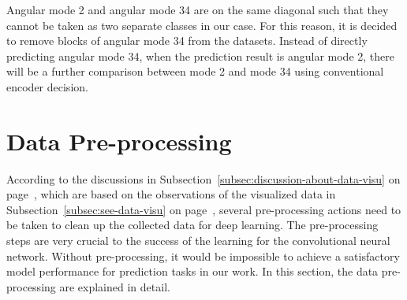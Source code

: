 Angular mode 2 and angular mode 34 are
on the same diagonal such that they cannot 
be taken as two separate classes in our case.
For this reason, it is decided to remove
blocks of angular mode 34
from the datasets.
Instead of directly predicting angular mode 34,
when the prediction result is angular mode 2,
there will be
a further comparison between mode 2 and mode 34 
using conventional encoder decision.

\section{Data Pre-processing}\label{sec:data-preprocessing}
According to the discussions in 
Subsection~\ref{subsec:discussion-about-data-visu}
on page~\pageref{subsec:discussion-about-data-visu},
which are based on the observations
of the visualized data in
Subsection~\ref{subsec:see-data-visu}
on page~\pageref{subsec:see-data-visu},
several pre-processing actions need
to be taken to clean up the collected data for deep learning.
The pre-processing steps are very crucial to the success
of the learning for the convolutional neural network.
Without pre-processing, it would be impossible
to achieve a satisfactory model performance 
for prediction tasks in our work.
In this section, the data pre-processing
are explained in detail.

